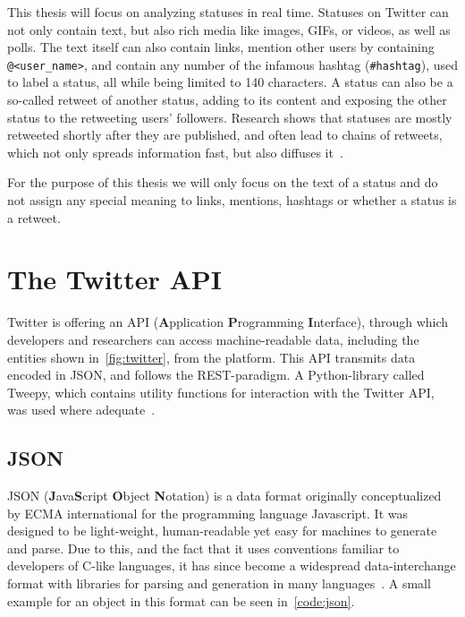 This thesis will focus on analyzing statuses in real time.
Statuses on Twitter can not only contain text, but also rich media like images, GIFs, or videos, as well as polls.
The text itself can also contain links, mention other users by containing \texttt{@<user\_name>},
and contain any number of the infamous hashtag (\texttt{\#hashtag}), used to label a status, all while being limited to 140 characters.
A status can also be a so-called retweet of another status, adding to its content and exposing the other status to the retweeting users' followers.
Research shows that statuses are mostly retweeted shortly after they are published, and often lead to chains of retweets,
which not only spreads information fast, but also diffuses it~\cite{Kwak2010}.

For the purpose of this thesis we will only focus on the text of a status and do not assign any special meaning to links,
mentions, hashtags or whether a status is a retweet.\\

\section{The Twitter API}
\label{sec:theApi}

Twitter is offering an API (\textbf{A}pplication \textbf{P}rogramming \textbf{I}nterface),
through which developers and researchers can access machine-readable data,
including the entities shown in~\cref{fig:twitter}, from the platform.
This API transmits data encoded in JSON, and follows the REST-paradigm.
A Python-library called Tweepy, which contains utility functions for interaction with the Twitter API, was used where adequate~\cite{tweepyDocs}.

\subsection{JSON}
\label{subsec:json}

JSON (\textbf{J}ava\textbf{S}cript \textbf{O}bject \textbf{N}otation) is a data format originally conceptualized by ECMA international
for the programming language Javascript.
It was designed to be light-weight, human-readable yet easy for machines to generate and parse.
Due to this, and the fact that it uses conventions familiar to developers of C-like languages,
it has since become a widespread data-interchange format with libraries for parsing and generation in many languages~\cite{jsonDocs}.
A small example for an object in this format can be seen in~\cref{code:json}.


